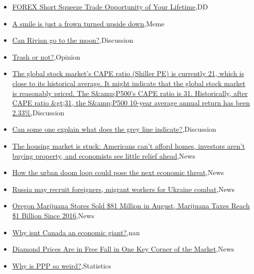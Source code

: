 \documentclass{article}%
\begin{document}
%
\begin{itemize}%
\item%
\href{https://reddit.com/r/wallstreetbets/comments/169pxq8/forex\_short\_squeeze\_trade\_opportunity\_of\_your/}{FOREX Short Squeeze Trade Opportunity of Your Lifetime},DD%
\item%
\href{https://reddit.com/r/wallstreetbets/comments/169j1a3/a\_smile\_is\_just\_a\_frown\_turned\_upside\_down/}{A smile is just a frown turned upside down},Meme%
\item%
\href{https://reddit.com/r/wallstreetbets/comments/169i5he/can\_rivian\_go\_to\_the\_moon/}{Can Rivian go to the moon?},Discussion%
\item%
\href{https://reddit.com/r/StockMarket/comments/169afgm/trash\_or\_not/}{Trash or not?},Opinion%
\item%
\href{https://reddit.com/r/StockMarket/comments/168f8fj/the\_global\_stock\_markets\_cape\_ratio\_shiller\_pe\_is/}{The global stock market's CAPE ratio (Shiller PE) is currently 21, which is close to its historical average. It might indicate that the global stock market is reasonably priced. The S\&amp;P500's CAPE ratio is 31. Historically, after CAPE ratio \&gt;31, the S\&amp;P500 10-year average annual return has been 2.33\%},Discussion%
\item%
\href{https://reddit.com/r/StockMarket/comments/167pky5/can\_some\_one\_explain\_what\_does\_the\_grey\_line/}{Can some one explain what does the grey line indicate?},Discussion%
\item%
\href{https://reddit.com/r/Economics/comments/169j256/the\_housing\_market\_is\_stuck\_americans\_cant\_afford/}{The housing market is stuck: Americans can't afford homes, investors aren't buying property, and economists see little relief ahead},News%
\item%
\href{https://reddit.com/r/Economics/comments/1699ict/how\_the\_urban\_doom\_loop\_could\_pose\_the\_next/}{How the urban doom loop could pose the next economic threat},News%
\item%
\href{https://reddit.com/r/Economics/comments/1697b1w/russia\_may\_recruit\_foreigners\_migrant\_workers\_for/}{Russia may recruit foreigners, migrant workers for Ukraine combat},News%
\item%
\href{https://reddit.com/r/Economics/comments/1696wv5/oregon\_marijuana\_stores\_sold\_81\_million\_in\_august/}{Oregon Marijuana Stores Sold \$81 Million in August, Marijuana Taxes Reach \$1 Billion Since 2016},News%
\item%
\href{https://reddit.com/r/Economics/comments/1696f2j/why\_isnt\_canada\_an\_economic\_giant/}{Why isnt Canada an economic giant?},nan%
\item%
\href{https://reddit.com/r/Economics/comments/168zm4t/diamond\_prices\_are\_in\_free\_fall\_in\_one\_key\_corner/}{Diamond Prices Are in Free Fall in One Key Corner of the Market},News%
\item%
\href{https://reddit.com/r/Economics/comments/168vyra/why\_is\_ppp\_so\_weird/}{Why is PPP so weird?},Statistics%
\end{itemize}%
\end{document}
